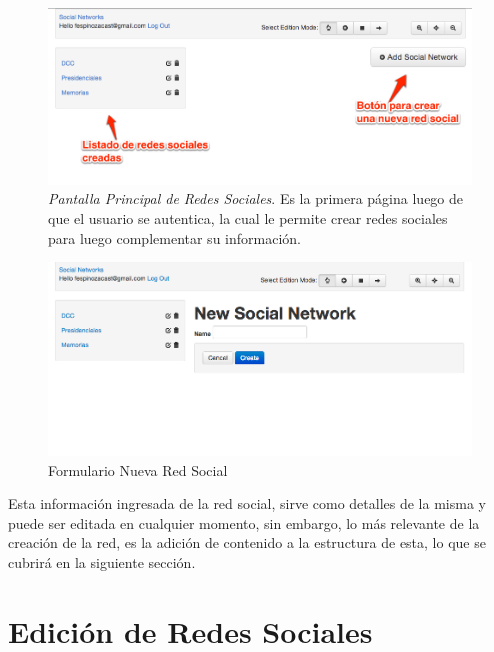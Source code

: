\begin{figure}[H]
  \centering
  \includegraphics[width=1.0\textwidth]{images/principal_social_networks.png}
  \caption[Pantalla Principal de Redes Sociales]{\emph{Pantalla Principal de Redes Sociales}. Es la primera página luego de que el usuario se autentica, la cual le permite crear redes sociales para luego complementar su información.}
  \label{principal_social_network}
\end{figure}

\begin{figure}[H]
  \centering
  \includegraphics[width=1.0\textwidth]{images/new_social_network.png}
  \caption{Formulario Nueva Red Social}
  \label{new_social_network}
\end{figure}

Esta información ingresada de la red social, sirve como detalles de la misma y puede ser editada en cualquier momento, sin embargo, lo más relevante de la creación de la red, es la adición de contenido a la estructura de esta, lo que se cubrirá en la siguiente sección.


\section{Edición de Redes Sociales} %
\label{sec:edicion_de_redes_sociales}

